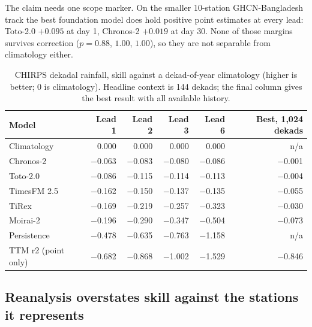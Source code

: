 The claim needs one scope marker. On the smaller 10-station GHCN-Bangladesh track the best foundation model does
hold positive point estimates at every lead: Toto-2.0 $+0.095$ at day 1, Chronos-2 $+0.019$ at day 30. None of
those margins survives correction ($p = 0.88$, $1.00$, $1.00$), so they are not separable from climatology
either.

\begin{table}[htbp]
  \centering
  \caption{CHIRPS dekadal rainfall, skill against a dekad-of-year climatology (higher is better; 0 is climatology).
  Headline context is 144 dekads; the final column gives the best result with all available history.}
  \label{tab:dekadal}
  \begin{tabular}{lrrrrr}
    \toprule
    Model & Lead 1 & Lead 2 & Lead 3 & Lead 6 & Best, 1{,}024 dekads \\
    \midrule
    Climatology        & \num{0.000} & \num{0.000} & \num{0.000} & \num{0.000} & n/a \\
    Chronos-2          & \num{-0.063} & \num{-0.083} & \num{-0.080} & \num{-0.086} & \num{-0.001} \\
    Toto-2.0           & \num{-0.086} & \num{-0.115} & \num{-0.114} & \num{-0.113} & \num{-0.004} \\
    TimesFM 2.5        & \num{-0.162} & \num{-0.150} & \num{-0.137} & \num{-0.135} & \num{-0.055} \\
    TiRex              & \num{-0.169} & \num{-0.219} & \num{-0.257} & \num{-0.323} & \num{-0.030} \\
    Moirai-2           & \num{-0.196} & \num{-0.290} & \num{-0.347} & \num{-0.504} & \num{-0.073} \\
    Persistence        & \num{-0.478} & \num{-0.635} & \num{-0.763} & \num{-1.158} & n/a \\
    TTM r2 (point only)& \num{-0.682} & \num{-0.868} & \num{-1.002} & \num{-1.529} & \num{-0.846} \\
    \bottomrule
  \end{tabular}
\end{table}

\subsection{Reanalysis overstates skill against the stations it represents}

